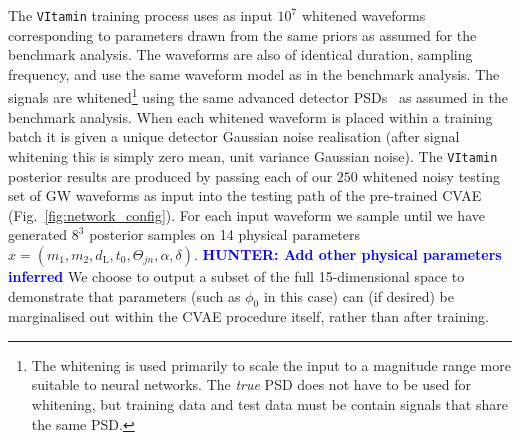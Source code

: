 \documentclass[%
showpacs,
nofootinbib,
 amsmath,amssymb,
 aps,
 twocolumn,
 prl,
 reprint,
floatfix,
]{revtex4-1}
\newcommand{\hunter}[1]{\textbf{\textcolor{blue}{HUNTER: #1}}}
\begin{document}
%
%
The \texttt{VItamin} training process uses as input $10^{7}$ whitened
waveforms corresponding to parameters drawn from the same priors as assumed for
the benchmark analysis. The waveforms are also of identical duration, sampling
frequency, and use the same waveform model as in the benchmark analysis.
The signals are whitened\footnote{The whitening is used primarily to
scale the input to a magnitude range more suitable to neural networks. The
\emph{true} \ac{PSD} does not have to be used for whitening, but training data
and test data must be contain signals that share the same \ac{PSD}.}
using the same advanced detector \acp{PSD}~\cite{aligo_noisecurves} as
assumed in the benchmark analysis. When each whitened waveform is placed
within a training batch it is given a unique detector Gaussian noise
realisation (after signal whitening this is simply zero mean, unit
variance Gaussian noise). The \texttt{VItamin} posterior results are produced by
passing each of our $250$ whitened noisy testing set of \ac{GW} waveforms
as input into the testing path of the pre-trained
\ac{CVAE} (Fig.~\ref{fig:network_config}). For each input waveform we sample until we
have generated $8^3$ posterior samples on 14 physical parameters
$x=(m_1,m_2,d_{\text{L}},t_{0},\Theta_{jn},\alpha,\delta)$. \hunter{
Add other physical parameters inferred} We choose to
output a subset of the full 15-dimensional space to demonstrate that parameters
(such as $\phi_0$ in this case) can (if desired) be
marginalised out within the \ac{CVAE} procedure itself, rather than after
training. 
\end{document}
